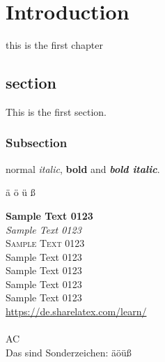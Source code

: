 \chapter{Introduction}

this is the first chapter

\section{section}

This is the first section.

\subsection{Subsection}

normal \emph{italic}, \textbf{bold} and \textbf{\emph{bold italic}}.

ä ö ü ß


{\textbf{Sample Text 0123}}
\\ %
{\textit{Sample Text 0123}}
\\ %
{\textsc{Sample Text 0123}}
\\ %
{\textsf{Sample Text 0123}}
\\ %
{\tiny{Sample Text 0123}}
\\ %
{\normalsize{Sample Text 0123}}
\\ %
{\huge{Sample Text 0123}}
\\ %
{\color{HyperlinkBlue}\url{https://de.sharelatex.com/learn/}}
\\
\\
AC
\\
Das sind Sonderzeichen: äöüß